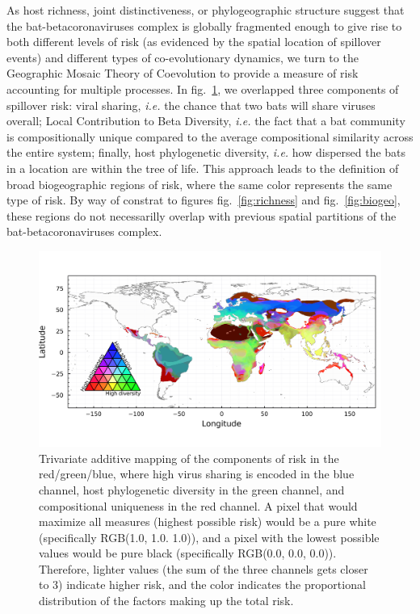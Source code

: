 \documentclass[11pt]{article}
\makeatletter
\def\maxwidth{\ifdim\Gin@nat@width>\linewidth\linewidth
\else\Gin@nat@width\fi}
\let\Oldincludegraphics\includegraphics
\renewcommand{\includegraphics}[1]{\Oldincludegraphics[width=\maxwidth]{#1}}
\makeatother
\begin{document}
As host richness, joint distinctiveness, or phylogeographic structure
suggest that the bat-betacoronaviruses complex is globally fragmented
enough to give rise to both different levels of risk (as evidenced by
the spatial location of spillover events) and different types of
co-evolutionary dynamics, we turn to the Geographic Mosaic Theory of
Coevolution to provide a measure of risk accounting for multiple
processes. In fig.~\ref{fig:trivariate}, we overlapped three components
of spillover risk: viral sharing, \emph{i.e.} the chance that two bats
will share viruses overall; Local Contribution to Beta Diversity,
\emph{i.e.} the fact that a bat community is compositionally unique
compared to the average compositional similarity across the entire
system; finally, host phylogenetic diversity, \emph{i.e.} how dispersed
the bats in a location are within the tree of life. This approach leads
to the definition of broad biogeographic regions of risk, where the same
color represents the same type of risk. By way of constrat to figures
fig.~\ref{fig:richness} and fig.~\ref{fig:biogeo}, these regions do not
necessarilly overlap with previous spatial partitions of the
bat-betacoronaviruses complex.

\begin{figure}
\hypertarget{fig:trivariate}{%
\centering
\includegraphics{figures/risk_trivariate.png}
\caption{Trivariate additive mapping of the components of risk in the
red/green/blue, where high virus sharing is encoded in the blue channel,
host phylogenetic diversity in the green channel, and compositional
uniqueness in the red channel. A pixel that would maximize all measures
(highest possible risk) would be a pure white (specifically RGB(1.0,
1.0. 1.0)), and a pixel with the lowest possible values would be pure
black (specifically RGB(0.0, 0.0, 0.0)). Therefore, lighter values (the
sum of the three channels gets closer to 3) indicate higher risk, and
the color indicates the proportional distribution of the factors making
up the total risk.}\label{fig:trivariate}
}
\end{figure}
\end{document}
